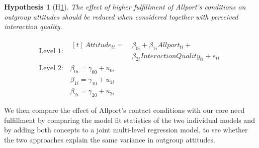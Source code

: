 \documentclass[man, 12pt, a4paper, mask]{apa7}
\theoremstyle{break}
\theoremstyle{plain}
\newtheorem{subhyp}{Hypothesis}
\begin{document}
\begin{mdframed}[style=mdfhypothesis]
    \begin{subhyp}[H\ref{hyp:AttAllportQual}] \label{hyp:AttAllportQual}
    \addtolength{\leftskip}{\subhypskip}
    The effect of higher fulfillment of Allport's conditions on outgroup attitudes should be reduced when considered together with perceived interaction quality.
    \end{subhyp}
    
    \begin{fleqn}[\eqskip]
      \begin{equation} \label{eq:SlopesAttAllportQual}
        \begin{split}
          \textrm{Level 1:} &
            \begin{aligned}[t]
              \ Attitude_{ti} =  &\ \beta_{0i} + \beta_{1i}Allport_{ti} + \\
                                 &\ \beta_{2i}InteractionQuality_{ti} + e_{ti}
            \end{aligned} \\
          \textrm{Level 2:} &\ \beta_{0i} = \gamma_{00} + u_{0i} \\
                            &\ \beta_{1i} = \gamma_{10} + u_{1i} \\
                            &\ \beta_{2i} = \gamma_{20} + u_{2i}
        \end{split} 
      \end{equation}
    \end{fleqn}
\end{mdframed}

We then compare the effect of Allport's contact conditions with our core need fulfillment by comparing the model fit statistics of the two individual models and by adding both concepts to a joint multi-level regression model, to see whether the two approaches explain the same variance in outgroup attitudes.
\end{document}
